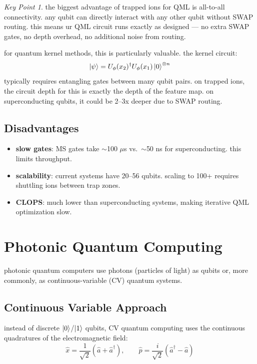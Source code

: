 \documentclass[11pt,a4paper]{article}
\theoremstyle{definition}
\theoremstyle{remark}
\newtheorem*{keypoint}{Key Point}
\begin{document}
\begin{keypoint}
the biggest advantage of trapped ions for QML is all-to-all connectivity. any qubit can directly interact with any other qubit without SWAP routing. this means ur QML circuit runs exactly as designed --- no extra SWAP gates, no depth overhead, no additional noise from routing.
\end{keypoint}

for quantum kernel methods, this is particularly valuable. the kernel circuit:
\[
\ket{\psi} = U_\phi(x_2)^\dagger U_\phi(x_1) \ket{0}^{\otimes n}
\]
typically requires entangling gates between many qubit pairs. on trapped ions, the circuit depth for this is exactly the depth of the feature map. on superconducting qubits, it could be 2--3x deeper due to SWAP routing.

\subsection{Disadvantages}

\begin{itemize}[leftmargin=*]
    \item \textbf{slow gates}: MS gates take $\sim$100 $\mu$s vs.\ $\sim$50 ns for superconducting. this limits throughput.
    \item \textbf{scalability}: current systems have 20--56 qubits. scaling to 100+ requires shuttling ions between trap zones.
    \item \textbf{CLOPS}: much lower than superconducting systems, making iterative QML optimization slow.
\end{itemize}

\section{Photonic Quantum Computing}

photonic quantum computers use photons (particles of light) as qubits or, more commonly, as continuous-variable (CV) quantum systems.

\subsection{Continuous Variable Approach}

instead of discrete $\ket{0}$/$\ket{1}$ qubits, CV quantum computing uses the continuous quadratures of the electromagnetic field:
\[
\hat{x} = \frac{1}{\sqrt{2}}(\hat{a} + \hat{a}^\dagger), \qquad \hat{p} = \frac{i}{\sqrt{2}}(\hat{a}^\dagger - \hat{a})
\]
\end{document}
